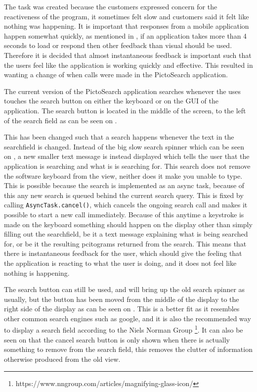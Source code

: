 The task was created because the customers expressed concern for the reactiveness of the program, it sometimes felt slow and customers said it felt like nothing was happening.
It is important that responses from a mobile application happen somewhat quickly, as mentioned in \cite{Roto:2005:NNF:1062745.1062747}, if an application takes more than 4 seconds to load or respond then other feedback than visual should be used.
Therefore it is decided that almost instantaneous feedback is important such that the users feel like the application is working quickly and effective.
This resulted in wanting a change of when calls were made in the PictoSearch application.

The current version of the PictoSearch application searches whenever the uses touches the search button on either the keyboard or on the GUI of the application.
The search button is located in the middle of the screen, to the left of the search field as can be seen on .

This has been changed such that a search happens whenever the text in the searchfield is changed.
Instead of the big slow search spinner which can be seen on , a new smaller text message is instead displayed which tells the user that the application is searching and what is is searching for. 
This search does not remove the software keyboard from the view, neither does it make you unable to type.
This is possible because the search is implemented as an async task, because of this any new search is queued behind the current search query.
This is fixed by calling \texttt{AsyncTask.cancel()}, which cancels the ongoing search call and makes it possible to start a new call immediately.
Because of this anytime a keystroke is made on the keyboard something should happen on the display other than simply filling out the searchfield, be it a text message explaining what is being searched for, or be it the resulting pcitograms returned from the search.
This means that there is instantaneous feedback for the user, which should give the feeling that the application is reacting to what the user is doing, and it does not feel like nothing is happening.

The search button can still be used, and will bring up the old search spinner as usually, but the button has been moved from the middle of the display to the right side of the display as can be seen on .
This is a better fit as it resembles other common search engines such as google, and it is also the recommended way to display a search field according to the Niels Norman Group \footnote{https://www.nngroup.com/articles/magnifying-glass-icon/}.
It can also be seen on  that the cancel search button is only shown when there is actually something to remove from the search field, this removes the clutter of information otherwise produced from the old view.